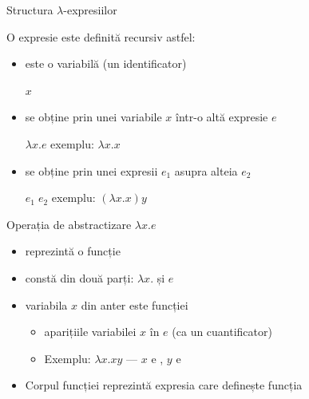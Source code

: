\documentclass[xcolor=pdftex,romanian,colorlinks]{beamer}
\begin{document}
\begin{frame}{Structura \(\lambda\)-expresiilor}
\protect\hypertarget{structura-lambda-expresiilor}{}

\begin{block}{O expresie este definită recursiv astfel:}

\begin{itemize}
\item
  este o variabilă (un identificator)

  \(x\)
\item
  se obține prin  unei variabile \(x\) într-o altă
  expresie \(e\)

  \(\lambda x . e\) \hfill exemplu: \(\lambda x . x\)
\item
  se obține prin  unei expresii \(e_1\) asupra alteia
  \(e_2\)

  \(e_1 \; e_2\) \hfill exemplu: \((\lambda x . x) y\)
\end{itemize}

\end{block}

\begin{block}{Operația de abstractizare \(\lambda x . e\)}

\begin{itemize}

\item
  reprezintă o funcție 
\item
  constă din două parți:  \(\lambda x .\) și 
  \(e\)
\item
  variabila \(x\) din anter este  funcției

  \begin{itemize}
  
  \item
     aparițiile variabilei \(x\) în \(e\) (ca un
    cuantificator)
  \item
    Exemplu: \(\lambda x . x y\) --- \(x\) e , \(y\) e
  \end{itemize}
\item
  Corpul funcției reprezintă expresia care definește funcția
\end{itemize}

\end{block}

\end{frame}
\end{document}

